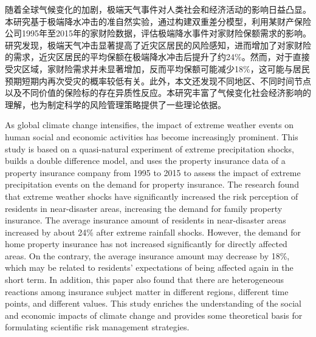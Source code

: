 \begin{cabstract}
    随着全球气候变化的加剧，极端天气事件对人类社会和经济活动的影响日益凸显。本研究基于极端降水冲击的准自然实验，通过构建双重差分模型，利用某财产保险公司1995年至2015年的家财险数据，评估极端降水事件对家财险保额需求的影响。研究发现，极端天气冲击显著提高了近灾区居民的风险感知，进而增加了对家财险的需求，近灾区居民的平均保额在极端降水冲击后提升了约24\%。然而，对于直接受灾区域，家财险需求并未显著增加，反而平均保额可能减少18\%，这可能与居民预期短期内再次受灾的概率较低有关。此外，本文还发现不同地区、不同时间节点以及不同价值的保险标的存在异质性反应。本研究丰富了气候变化社会经济影响的理解，也为制定科学的风险管理策略提供了一些理论依据。
\end{cabstract}
\begin{eabstract}
    As global climate change intensifies, the impact of extreme weather events on human social and economic activities has become increasingly prominent. This study is based on a quasi-natural experiment of extreme precipitation shocks, builds a double difference model, and uses the property insurance data of a property insurance company from 1995 to 2015 to assess the impact of extreme precipitation events on the demand for property insurance. The research found that extreme weather shocks have significantly increased the risk perception of residents in near-disaster areas, increasing the demand for family property insurance. The average insurance amount of residents in near-disaster areas increased by about 24\% after extreme rainfall shocks. However, the demand for home property insurance has not increased significantly for directly affected areas. On the contrary, the average insurance amount may decrease by 18\%, which may be related to residents' expectations of being affected again in the short term. In addition, this paper also found that there are heterogeneous reactions among insurance subject matter in different regions, different time points, and different values. This study enriches the understanding of the social and economic impacts of climate change and provides some theoretical basis for formulating scientific risk management strategies.
\end{eabstract}
